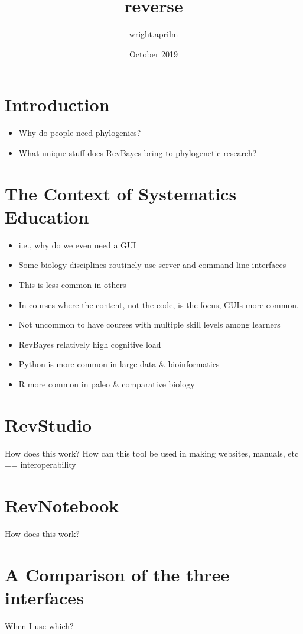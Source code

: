 \documentclass{article}
\title{reverse}
\author{wright.aprilm }
\date{October 2019}
\begin{document}
\maketitle
\section{Introduction}

\begin{itemize}
    \item Why do people need phylogenies?
    \item What unique stuff does RevBayes bring to phylogenetic research? 
\end{itemize}

\section{The Context of Systematics Education}

\begin{itemize}
    \item i.e., why do we even need a GUI
    \item Some biology disciplines routinely use server and command-line interfaces
    \item This is less common in others
    \item In courses where the content, not the code, is the focus, GUIs more common.
    \item Not uncommon to have courses with multiple skill levels among learners
    \item RevBayes relatively high cognitive load
    \item Python is more common in large data \& bioinformatics
    \item R more common in paleo \& comparative biology
\end{itemize}

\section{RevStudio}

How does this work?  
How can this tool be used in making websites, manuals, etc == interoperability

\section{RevNotebook}

How does this work? 

\section{A Comparison of the three interfaces}

When I use which?
\end{document}
